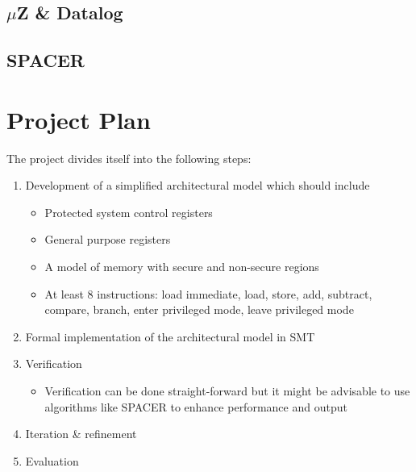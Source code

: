 \documentclass{securem}
\begin{document}
\subsection{$ \mu $Z \& Datalog}

\subsection{SPACER}

\section{Project Plan}

The project divides itself into the following steps:
\begin{enumerate}
    \item Development of a simplified architectural model which should include
    \begin{itemize}
        \item Protected system control registers
        \item General purpose registers
        \item A model of memory with secure and non-secure regions
        \item At least 8 instructions: load immediate, load, store, add, subtract, compare, branch, enter privileged mode, leave privileged mode
    \end{itemize}
    \item Formal implementation of the architectural model in SMT
    \item Verification
    \begin{itemize}
        \item Verification can be done straight-forward but it might be advisable to use algorithms like SPACER to enhance performance and output
    \end{itemize}
    \item Iteration \& refinement
    \item Evaluation
\end{enumerate}



\end{document}
